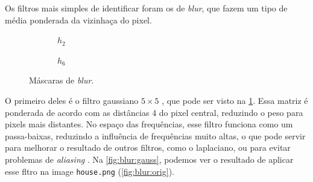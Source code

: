 Os filtros mais simples de identificar foram os de \textit{blur}, que fazem um tipo de média ponderada da vizinhaça do pixel.

\begin{figure}[H]
    \centering
    \begin{subfigure}{0.4\textwidth}
        \centering
        
        \caption{~$h_2$}
        \label{fig:h2}
    \end{subfigure}%
    \begin{subfigure}{0.4\textwidth}
        \centering
        
        \caption{~$h_6$}
        \label{fig:h6}
    \end{subfigure}

    \caption{Máscaras de \textit{blur}.}
    \label{fig:blur:kernel}
\end{figure}

O primeiro deles é o filtro gaussiano $5 \times 5$ \autocite{ref:gaussian}, que pode ser visto na \cref{fig:h2}. Essa matriz é ponderada de acordo com as distâncias 4 do pixel central, reduzindo o peso para pixels mais distantes. No espaço das frequências, esse filtro funciona como um passa-baixas, reduzindo a influência de frequências muito altas, o que pode servir para melhorar o resultado de outros filtros, como o laplaciano, ou para evitar problemas de \textit{aliasing} \autocite{ref:gaussian-lowpass}. Na \cref{fig:blur:gauss}, podemos ver o resultado de aplicar esse fltro na image \texttt{house.png} (\ref{fig:blur:orig}).

